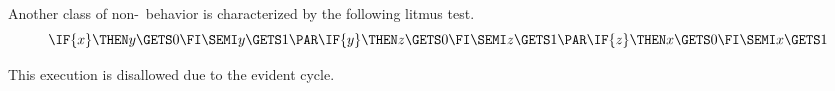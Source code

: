 Another class of non-\mca\ behavior is characterized by the following litmus test.
\begin{displaymath}
  \IF{x}\THEN y\GETS0 \FI \SEMI y\GETS1
  \PAR
  \IF{y}\THEN z\GETS0 \FI \SEMI z\GETS1
  \PAR
  \IF{z}\THEN x\GETS0 \FI \SEMI x\GETS1
\end{displaymath}
\begin{tikzdisplay}[node distance=1em]
\end{tikzdisplay}
This execution is disallowed due to the evident cycle.



